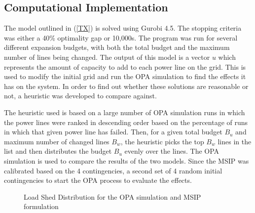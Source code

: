 \subsection{Computational Implementation}
The model outlined in (\ref{TX}) is solved using Gurobi 4.5.  The stopping criteria was either a 40\% optimality gap or 10,000s.  The program was run for several different expansion budgets, with both the total budget and the maximum number of lines being changed.  The output of this model is a vector $u$ which represents the amount of capacity to add to each power line on the grid.  This is used to modify the initial grid and run the OPA simulation to find the effects it has on the system.  In order to find out whether these solutions are reasonable or not, a heuristic was developed to compare against.

The heuristic used is based on a large number of OPA simulation runs in which the power lines were ranked in descending order based on the percentage of runs in which that given power line has failed.  Then, for a given total budget $B_u$ and maximum number of changed lines $B_w$, the heuristic picks the top $B_w$ lines in the list and then distributes the budget $B_u$ evenly over the lines.  The OPA simulation is used to compare the results of the two models.  Since the MSIP was calibrated based on the 4 contingencies, a second set of 4 random initial contingencies to start the OPA process to evaluate the effects.




\begin{figure}
 \centering
  \caption{Load Shed Distribution for the OPA simulation and MSIP formulation}
 \label{dist}
\end{figure}

